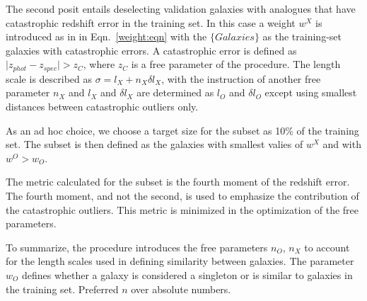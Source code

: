 \documentclass[preprint]{aastex}
\providecommand{\abs}[1]{\lvert#1\rvert}
\begin{document}
The second posit entails deselecting validation galaxies with analogues that have catastrophic redshift error
in the training set.  In this case a weight $w^X$ is introduced as in in Eqn.\ \ref{weight:eqn}  with the $\{Galaxies\}$
as the training-set galaxies with catastrophic errors.  A catastrophic error is
defined as $\abs{z_{phot}-z_{spec}}> z_C$, where $z_C$ is a free parameter of the procedure.
The length scale is described as $\sigma = l_X +
n_X\delta l_X$, with the instruction of another free parameter $n_X$ and
$l_X$ and $\delta l_X$ are determined as  $l_O$ and $\delta l_O$
except using smallest distances between catastrophic outliers only.

As an ad hoc choice, we choose a target size for the subset as 10\% of the training set.
The subset is then defined as the galaxies with smallest valies of $w^X$ and with  $w^O>w_O$.

The metric calculated for the subset is the fourth moment of the redshift error. The fourth moment, and not the
second, is used to emphasize the contribution of the catastrophic outliers.  This metric is minimized
in the optimization of the free parameters.

To summarize, the procedure introduces the free parameters $n_O$, $n_X$ to account for the length scales
used in defining similarity between galaxies.  The parameter $w_O$ defines whether a galaxy is considered
a singleton or is similar to galaxies in the training set.
Preferred $n$ over absolute numbers.
\end{document}
